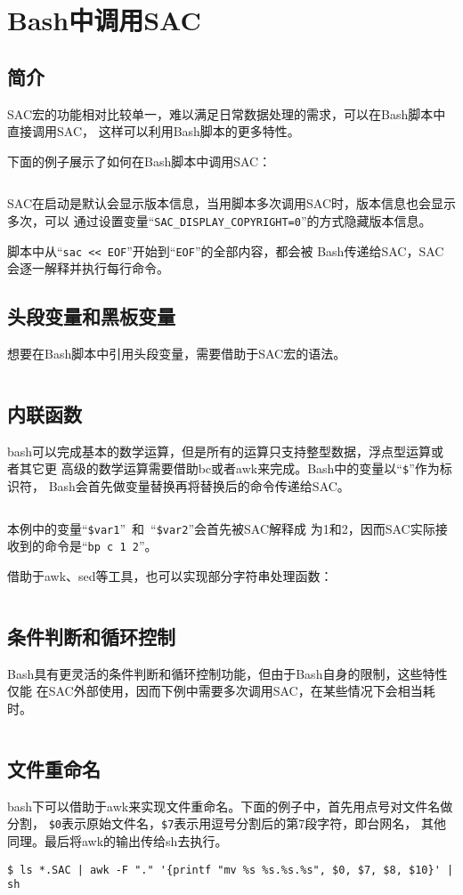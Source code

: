 \section{Bash中调用SAC}
\label{sec:sac-bash}

\subsection{简介}
SAC宏的功能相对比较单一，难以满足日常数据处理的需求，可以在Bash脚本中直接调用SAC，
这样可以利用Bash脚本的更多特性。

下面的例子展示了如何在Bash脚本中调用SAC：
\inputminted{bash}{./call-in-script/simple-script.sh}

SAC在启动是默认会显示版本信息，当用脚本多次调用SAC时，版本信息也会显示多次，可以
通过设置变量``\verb+SAC_DISPLAY_COPYRIGHT=0+''的方式隐藏版本信息。

脚本中从``\verb+sac << EOF+''开始到``\verb+EOF+''的全部内容，都会被
Bash传递给SAC，SAC会逐一解释并执行每行命令。

\subsection{头段变量和黑板变量}
想要在Bash脚本中引用头段变量，需要借助于SAC宏的语法。
\inputminted{bash}{./call-in-script/variables.sh}

\subsection{内联函数}
bash可以完成基本的数学运算，但是所有的运算只支持整型数据，浮点型运算或者其它更
高级的数学运算需要借助bc或者awk来完成。Bash中的变量以``\verb+$+''作为标识符，
Bash会首先做变量替换再将替换后的命令传递给SAC。
\inputminted{bash}{./call-in-script/arithmetic-functions.sh}

本例中的变量``\verb+$var1+''~和~``\verb+$var2+''会首先被SAC解释成
为1和2，因而SAC实际接收到的命令是``\verb+bp c 1 2+''。

借助于awk、sed等工具，也可以实现部分字符串处理函数：
\inputminted{bash}{./call-in-script/string-functions.sh}

\subsection{条件判断和循环控制}
Bash具有更灵活的条件判断和循环控制功能，但由于Bash自身的限制，这些特性仅能
在SAC外部使用，因而下例中需要多次调用SAC，在某些情况下会相当耗时。
\inputminted{bash}{./call-in-script/do-loops.sh}

\subsection{文件重命名}
\label{subsec:rename-in-bash}
bash下可以借助于awk来实现文件重命名。下面的例子中，首先用点号对文件名做分割，
\verb+$0+表示原始文件名，\verb+$7+表示用逗号分割后的第7段字符，即台网名，
其他同理。最后将awk的输出传给sh去执行。
\begin{verbatim}
$ ls *.SAC | awk -F "." '{printf "mv %s %s.%s.%s", $0, $7, $8, $10}' | sh
\end{verbatim}
